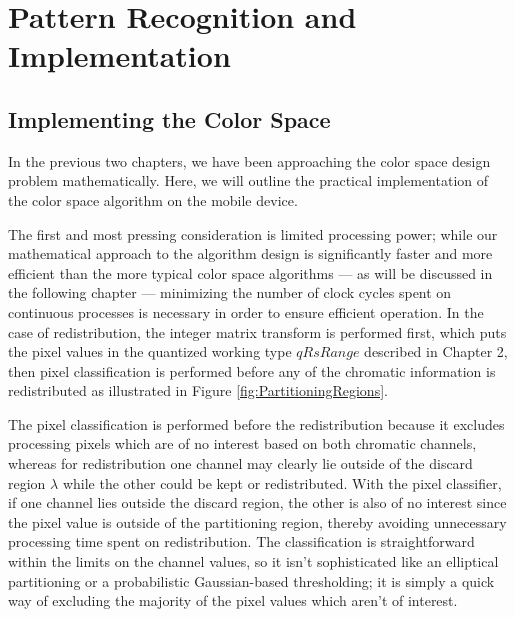 \chapter{Pattern Recognition and Implementation}


\ifpdf
    \graphicspath{{Chapter4/Figs/Raster/}{Chapter4/Figs/PDF/}{Chapter4/Figs/}}
\else
    \graphicspath{{Chapter4/Figs/Vector/}{Chapter4/Figs/}}
\fi


\section{Implementing the Color Space}\label{sec:ImplementingTheColorSpace}

In the previous two chapters, we have been approaching the color space design problem mathematically. Here, we will outline the practical implementation of the color space algorithm on the mobile device.

The first and most pressing consideration is limited processing power; while our mathematical approach to the algorithm design is significantly faster and more efficient than the more typical color space algorithms --- as will be discussed in the following chapter --- minimizing the number of clock cycles spent on continuous processes is necessary in order to ensure efficient operation. In the case of redistribution, the integer matrix transform is performed first, which puts the pixel values in the quantized working type $qRsRange$ described in Chapter 2, then pixel classification is performed before any of the chromatic information is redistributed as illustrated in Figure \ref{fig:PartitioningRegions}.

The pixel classification is performed before the redistribution because it excludes processing pixels which are of no interest based on both chromatic channels, whereas for redistribution one channel may clearly lie outside of the discard region $\lambda$ while the other could be kept or redistributed. With the pixel classifier, if one channel lies outside the discard region, the other is also of no interest since the pixel value is outside of the partitioning region, thereby avoiding unnecessary processing time spent on redistribution. The classification is straightforward within the limits on the channel values, so it isn't sophisticated like an elliptical partitioning or a probabilistic Gaussian-based thresholding; it is simply a quick way of excluding the majority of the pixel values which aren't of interest.

